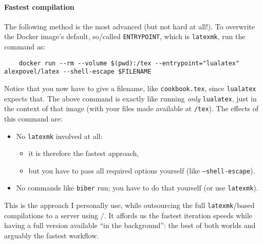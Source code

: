 \paragraph{Fastest compilation}
The following method is the most advanced (but not hard at all!).
To overwrite the Docker image's default, so\-/called \texttt{ENTRYPOINT}, which is \texttt{latexmk}, run the command as:
\begin{verbatim}
    docker run --rm --volume $(pwd):/tex --entrypoint="lualatex" alexpovel/latex --shell-escape $FILENAME
\end{verbatim}
Notice that you now have to give a filename, like \texttt{cookbook.tex}, since \texttt{lualatex} expects that.
The above command is exactly like running \emph{only} \texttt{lualatex}, just in the context of that image (with your files made available at \texttt{/tex}).
The effects of this command are:
\begin{itemize}
    \item No \texttt{latexmk} involved at all:
    \begin{itemize}
        \item it is therefore the fastest approach,
        \item but you have to pass all required options yourself (like \texttt{--shell-escape}).
    \end{itemize}
    \item No commands like \texttt{biber} run; you have to do that yourself (or use \texttt{latexmk}).
\end{itemize}
This is the approach I personally use, while outsourcing the full \texttt{latexmk}\-/based compilations to a server using /.
It affords us the fastest iteration speeds while having a full version available \enquote{in the background}: the best of both worlds and arguably the fastest workflow.

